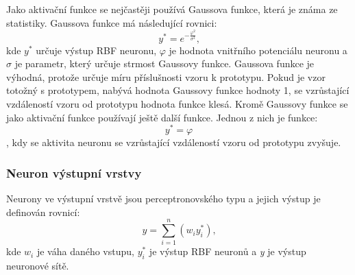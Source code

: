 \documentclass[11pt,twoside,a4paper]{book}
\begin{document}
Jako aktivační funkce se nejčastěji používá Gaussova funkce, která je známa ze statistiky. Gaussova funkce má následující rovnici:
\begin{equation}
y^{*}=e^{-\frac{\varphi^{2}}{\sigma^{2}}}\mbox{,}
\end{equation}
kde \begin{math}y^{*}\end{math} určuje výstup RBF neuronu, \begin{math}\varphi\end{math} je hodnota vnitřního potenciálu neuronu a \begin{math}\sigma\end{math} je parametr, který určuje strmost Gaussovy funkce. Gaussova funkce je výhodná, protože určuje míru příslušnosti vzoru k prototypu. Pokud je vzor totožný s prototypem, nabývá hodnota Gaussovy funkce hodnoty 1, se vzrůstající vzdáleností vzoru od prototypu hodnota funkce klesá. Kromě Gaussovy funkce se jako aktivační funkce používají ještě další funkce. Jednou z nich je funkce:
\begin{equation}
y^{*}=\varphi
\end{equation}, kdy se aktivita neuronu se vzrůstající vzdáleností vzoru od prototypu zvyšuje.

\subsubsection{Neuron výstupní vrstvy}
Neurony ve výstupní vrstvě jsou perceptronovského typu a jejich výstup je definován rovnicí:
\begin{equation}
y=\sum\limits_{i=1}^n(w_{i}y^{*}_{i})\mbox{,}
\end{equation}
kde \begin{math}w_{i}\end{math} je váha daného vstupu, \begin{math}y^{*}_{i}\end{math} je výstup RBF neuronů a \textit{y} je výstup neuronové sítě.
\end{document}
